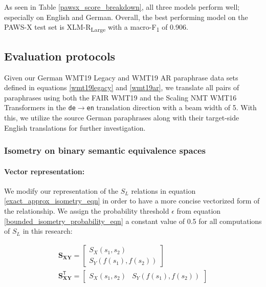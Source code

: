 \documentclass[11pt,a4paper]{article}
\begin{document}
As seen in Table \ref{pawsx_score_breakdown}, all three models perform well; especially on English and German. Overall, the best performing model on the PAWS-X test set is XLM-R\textsubscript{Large} with a macro-F\textsubscript{1} of 0.906.

\subsection{Evaluation protocols}

Given our German WMT19 Legacy and WMT19 AR paraphrase data sets defined in equations \ref{wmt19legacy} and \ref{wmt19ar}, we translate all pairs of paraphrases using both the FAIR WMT19 and the Scaling NMT WMT16 Transformers in the \texttt{de$\rightarrow$en} translation direction with a beam width of 5. With this, we utilize the source German paraphrases along with their target-side English translations for further investigation. 

\subsubsection{Isometry on binary semantic equivalence spaces}

\paragraph{Vector representation:} We modify our representation of the $S_L$ relations in equation \ref{exact_approx_isometry_eqn} in order to have a more concise vectorized form of the relationship. We assign the probability threshold $\epsilon$ from equation \ref{bounded_isometry_probability_eqn} a constant value of 0.5 for all computations of $S_L$ in this research:

\vspace{-5pt}
\begin{gather}
  \mathbf{S_{XY}} = \begin{bmatrix} S_X(s_1, s_2) \\[5pt] S_Y(f(s_1), f(s_2)) \end{bmatrix} \\[10pt] 
  \mathbf{S_{XY}^{\mathsf{T}}} = \begin{bmatrix} S_X(s_1, s_2) & S_Y(f(s_1), f(s_2)) \end{bmatrix}
\end{gather}
\end{document}
